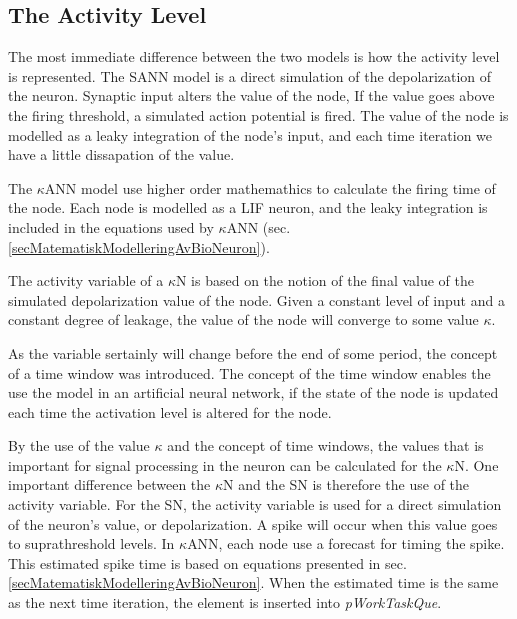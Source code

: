 	\subsection{The Activity Level}
	
	The most immediate difference between the two models is how the activity level is represented.
	The SANN model is a direct simulation of the depolarization of the neuron. 
	Synaptic input alters the value of the node, 
	If the value goes above the firing threshold, a simulated action potential is fired.
	The value of the node is modelled as a leaky integration of the node's input, and each time iteration we have a little dissapation of the value.

	The $\kappa$ANN model use higher order mathemathics to calculate the firing time of the node. %
	Each node is modelled as a LIF neuron, and the leaky integration is included in the equations used by $\kappa$ANN (sec. \ref{secMatematiskModelleringAvBioNeuron}).
	
	The activity variable of a $\kappa$N is based on the notion of the final value of the simulated depolarization value of the node.
	Given a constant level of input and a constant degree of leakage, the value of the node will converge to some value $\kappa$.

	As the variable sertainly will change before the end of some period, the concept of a time window was introduced.
	The concept of the time window enables the use the model in an artificial neural network, if the state of the node is updated each time the activation level is altered for the node.

	By the use of the value $\kappa$ and the concept of time windows, the values that is important for signal processing in the neuron can be calculated for the $\kappa$N.
	One important difference between the $\kappa$N and the SN is therefore the use of the activity variable.
	For the SN, the activity variable is used for a direct simulation of the neuron's value, or depolarization.
	A spike will occur when this value goes to suprathreshold levels.
	In $\kappa$ANN, each node use a forecast for timing the spike.
	This estimated spike time is based on equations presented in sec. \ref{secMatematiskModelleringAvBioNeuron}. %
	When the estimated time is the same as the next time iteration, the element is inserted into \emph{pWorkTaskQue}.


